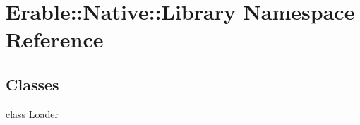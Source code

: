 \hypertarget{namespace_erable_1_1_native_1_1_library}{}\section{Erable\+::Native\+::Library Namespace Reference}
\label{namespace_erable_1_1_native_1_1_library}
\subsection*{Classes}
\begin{DoxyCompactItemize}
\item 
class \mbox{\hyperlink{class_erable_1_1_native_1_1_library_1_1_loader}{Loader}}
\end{DoxyCompactItemize}
